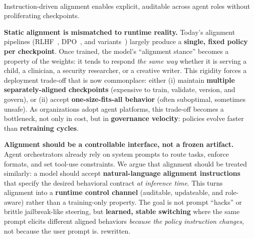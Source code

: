 \ThinRule


\vspace{0.4mm}
\ThinRule
\\
\noindent{}
Instruction-driven alignment enables explicit, auditable  across agent roles without proliferating checkpoints.






\textbf{Static alignment is mismatched to runtime reality.}
Today's alignment pipelines (RLHF~\cite{ouyang2022training,stiennon2020learning}, DPO~\cite{rafailov2023direct}, and variants~\cite{azar2023general,ethayarajh2024kto}) largely produce a \textbf{single, fixed policy per checkpoint}.
Once trained, the model's ``alignment stance'' becomes a property of the weights: it tends to respond \emph{the same way} whether it is serving a child, a clinician, a security researcher, or a creative writer.
This rigidity forces a deployment trade-off that is now commonplace:
either (i) maintain \textbf{multiple separately-aligned checkpoints} (expensive to train, validate, version, and govern), or (ii) accept \textbf{one-size-fits-all behavior} (often suboptimal, sometimes unsafe).
As organizations adopt agent platforms, this trade-off becomes a bottleneck, not only in cost, but in \textbf{governance velocity}: policies evolve faster than \textbf{retraining cycles}.

 

\textbf{Alignment should be a controllable interface, not a frozen artifact.}
Agent orchestrators already rely on system prompts to route tasks, enforce formats, and set tool-use constraints.
We argue that alignment should be treated similarly: a model should accept \textbf{natural-language alignment instructions} that specify the desired behavioral contract \emph{at inference time}.
This turns alignment into a \textbf{runtime control channel} (auditable, updateable, and role-aware) rather than a training-only property.
The goal is not prompt ``hacks'' or brittle jailbreak-like steering, but \textbf{learned, stable switching} where the same prompt elicits different aligned behaviors \emph{because the policy instruction changes}, not because the user prompt is.
rewritten. 


